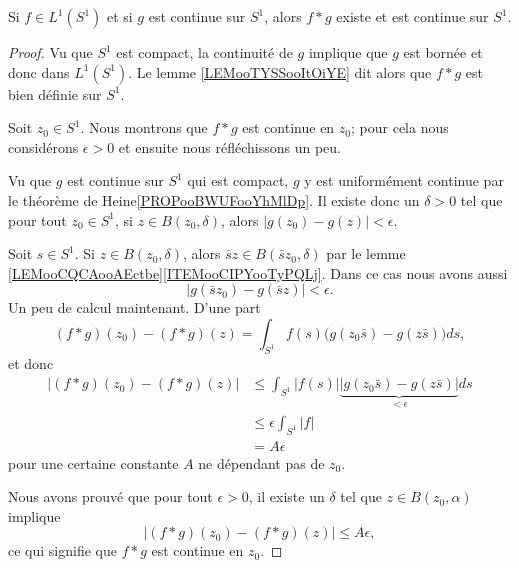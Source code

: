 \begin{lemma}
	Si \( f\in L^1(S^1)\) et si \( g\) est continue sur \( S^1\), alors \( f*g\) existe et est continue sur \( S^1\).
\end{lemma}

\begin{proof}
	Vu que \( S^1\) est compact, la continuité de \( g\) implique que \( g\) est bornée et donc dans \( L^1(S^1)\). Le lemme \ref{LEMooTYSSooItOiYE} dit alors que \( f*g\) est bien définie sur \( S^1\).

	Soit \( z_0\in S^1\). Nous montrons que \( f*g\) est continue en \( z_0\); pour cela nous considérons \( \epsilon>0\) et ensuite nous réfléchissons un peu.

	Vu que \( g\) est continue sur \( S^1\) qui est compact, \( g\) y est uniformément continue par le théorème de Heine\ref{PROPooBWUFooYhMlDp}. Il existe donc un \( \delta>0\) tel que pour tout \( z_0\in S^1\), si \( z\in B(z_0,\delta)\), alors \( | g(z_0)-g(z) |<\epsilon\).

	Soit \( s\in S^1\). Si \( z\in B(z_0,\delta)\), alors \( \bar sz\in B(\bar sz_0,\delta)\) par le lemme \ref{LEMooCQCAooAEctbe}\ref{ITEMooCIPYooTyPQLj}. Dans ce cas nous avons aussi
	\begin{equation}
		| g(\bar s z_0)-g(\bar sz) |<\epsilon.
	\end{equation}
	Un peu de calcul maintenant. D'une part
	\begin{equation}
		(f*g)(z_0)-(f*g)(z)=\int_{S^1}f(s)\big( g(z_0\bar s)-g(z\bar s) \big)ds,
	\end{equation}
	et donc
	\begin{subequations}
		\begin{align}
			|(f*g)(z_0)-(f*g)(z)| & \leq\int_{S^1}|f(s)| \underbrace{\big|  g(z_0\bar s)-g(z\bar s) \big|}_{<\epsilon} ds \\
			                      & \leq \epsilon\int_{S^1}| f |                                                          \\
			                      & =A\epsilon
		\end{align}
	\end{subequations}
	pour une certaine constante \( A\) ne dépendant pas de \( z_0\).

	Nous avons prouvé que pour tout \( \epsilon>0\), il existe un \( \delta\) tel que \( z\in B(z_0,\alpha)\) implique
	\begin{equation}
		|(f*g)(z_0)-(f*g)(z)|\leq A\epsilon,
	\end{equation}
	ce qui signifie que \( f*g\) est continue en \( z_0\).
\end{proof}

